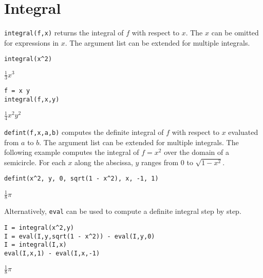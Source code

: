 \documentclass[12pt]{article}
\begin{document}
\section*{Integral}

\verb$integral(f,x)$ returns the integral of $f$ with respect to $x$.
The $x$ can be omitted for expressions in $x$.
The argument list can be extended for multiple integrals.

{\color{blue}
\begin{verbatim}
integral(x^2)
\end{verbatim}
}

\noindent
$\displaystyle \tfrac{1}{3}x^3$

{\color{blue}
\begin{verbatim}
f = x y
integral(f,x,y)
\end{verbatim}
}

\noindent
$\displaystyle \tfrac{1}{4}x^2y^2$

\bigskip
\noindent
\verb$defint(f,x,a,b)$
computes the definite integral of $f$ with respect to $x$ evaluated from
$a$ to $b$.
The argument list can be extended for multiple integrals.
The following example computes the integral of $f=x^2$
over the domain of a semicircle.
For each $x$ along the abscissa, $y$ ranges from 0 to $\sqrt{1-x^2}$.

{\color{blue}
\begin{verbatim}
defint(x^2, y, 0, sqrt(1 - x^2), x, -1, 1)
\end{verbatim}
}

\noindent
$\displaystyle \tfrac{1}{8}\pi$

\bigskip
\noindent
Alternatively, \verb$eval$ can be used to compute a definite integral step by step.

{\color{blue}
\begin{verbatim}
I = integral(x^2,y)
I = eval(I,y,sqrt(1 - x^2)) - eval(I,y,0)
I = integral(I,x)
eval(I,x,1) - eval(I,x,-1)
\end{verbatim}
}

\noindent
$\displaystyle \tfrac{1}{8}\pi$
\end{document}
